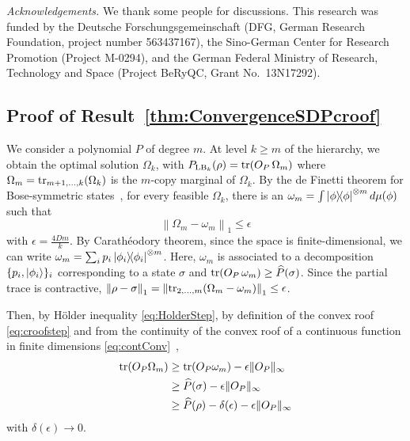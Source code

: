 \documentclass[aps,pra,twocolumn,showpacs,superscriptaddress,groupedaddress]{revtex4-2}
\newcommand{\og}[1]{{\color{orange} #1}}
\begin{document}
{\em Acknowledgements.} We thank \og{some people} for discussions. 
This research was funded by the Deutsche Forschungsgemeinschaft (DFG, German Research Foundation, project number 563437167), the Sino-German Center for Research Promotion (Project M-0294), and the German Federal Ministry of Research, Technology and Space (Project BeRyQC, Grant No.\ 13N17292).




\newpage
\bigskip




{}

\begin{widetext}



\appendix



\section{Proof of Result~\ref{thm:ConvergenceSDPcroof}}\label{app:ProofCongNonExtHier}
We consider a polynomial $P$ of degree $m$. At level $k \geq m$ of the hierarchy, we obtain the optimal solution $\Omega_k$, with $P_{{\rm LB}_k}(\rho) = \tr(O_P\, \Omega_m)$ where $\Omega_m = \tr_{m+1,\dots, k}(\Omega_k)$ is the $m$-copy marginal of $\Omega_k$.
By the de Finetti theorem for Bose-symmetric states~\cite[Thm.~II.8]{Christandl_2007}, for every feasible $\Omega_k$, there is an $\omega_m = \int \dyad{\phi}^{\otimes m} d\mu(\phi)$ such that
\begin{equation}
    \left\|\Omega_m - \omega_m\right\|_1 \leq \epsilon
\end{equation}
with $\epsilon = \tfrac{4 D m}{k}$. By Carath\'eodory theorem, since the space is finite-dimensional, we can write $\omega_m = \sum_i p_i \dyad{\phi_i}^{\otimes m}$. Here, $\omega_m$ is associated to a decomposition $\{p_i, \ket{\phi_i}\}_i$ corresponding to a state $\sigma$ and $\tr(O_P \,\omega_m) \geq \widehat{P}(\sigma)$. Since the partial trace is contractive, $\left\|\rho - \sigma\right\|_1 = \left\|\tr_{2,\dots, m}(\Omega_m - \omega_m)\right\|_1 \leq \epsilon$.

Then, by H\"{o}lder inequality \eqref{eq:HolderStep}, by definition of the convex roof \eqref{eq:croofstep} and from the continuity of the convex roof of a continuous function in finite dimensions \eqref{eq:contConv}~\cite[Thm.~6.1]{Bucicovschi2013},
\begin{align}
    \tr(O_P \Omega_m) &\geq \tr(O_P\omega_m) - \epsilon\|O_P\|_\infty \label{eq:HolderStep}\\
    &\geq \widehat{P}(\sigma) - \epsilon\|O_P\|_\infty \label{eq:croofstep}\\
    &\geq \widehat{P}(\rho) - \delta(\epsilon) - \epsilon\|O_P\|_\infty \label{eq:contConv}
\end{align}
with $\delta(\epsilon) \to 0$.


\end{widetext}
\end{document}
